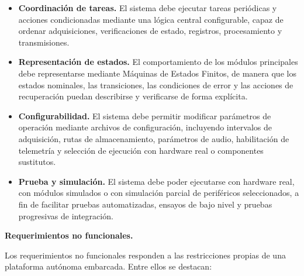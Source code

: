 \begin{itemize}
    \item \textbf{Coordinación de tareas.} El sistema debe ejecutar tareas periódicas y acciones condicionadas mediante una lógica central configurable, capaz de ordenar adquisiciones, verificaciones de estado, registros, procesamiento y transmisiones.

    \item \textbf{Representación de estados.} El comportamiento de los módulos principales debe representarse mediante Máquinas de Estados Finitos, de manera que los estados nominales, las transiciones, las condiciones de error y las acciones de recuperación puedan describirse y verificarse de forma explícita.

    \item \textbf{Configurabilidad.} El sistema debe permitir modificar parámetros de operación mediante archivos de configuración, incluyendo intervalos de adquisición, rutas de almacenamiento, parámetros de audio, habilitación de telemetría y selección de ejecución con hardware real o componentes sustitutos.

    \item \textbf{Prueba y simulación.} El sistema debe poder ejecutarse con hardware real, con módulos simulados o con simulación parcial de periféricos seleccionados, a fin de facilitar pruebas automatizadas, ensayos de bajo nivel y pruebas progresivas de integración.
\end{itemize}

\noindent\textbf{Requerimientos no funcionales.}

Los requerimientos no funcionales responden a las restricciones propias de una plataforma autónoma embarcada. Entre ellos se destacan:

